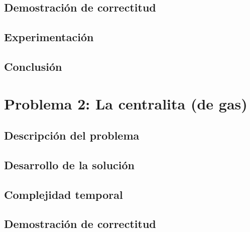 \documentclass[a4paper, 10pt, twoside]{article}
\begin{document}
\label{problema1-demostracion}
\subsection{Demostración de correctitud}


\subsection{Experimentación}
\label{problema1-experimentacion}


\subsection{Conclusión}
\label{problema1-resultados}


\newpage



\section{Problema 2: La centralita (de gas)}

\subsection{Descripción del problema}
\label{problema2-descripcion}


\subsection{Desarrollo de la solución}
\label{problema2-desarrollo}


\subsection{Complejidad temporal}
\label{problema2-complejidad}


\label{problema2-demostracion}
\subsection{Demostración de correctitud}

\end{document}

